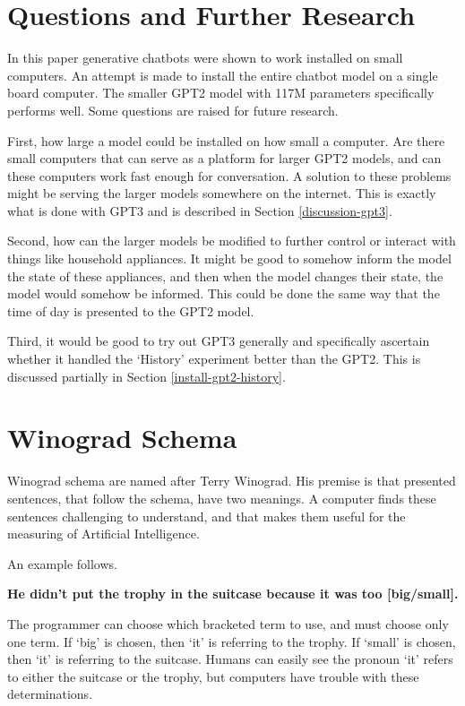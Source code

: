 \section{Questions and Further Research}

In this paper generative chatbots were shown to work installed on small computers. An attempt is made to install the entire chatbot model on a single board computer. The smaller GPT2 model with 117M parameters specifically performs well. Some questions are raised for future research.

First, how large a model could be installed on how small a computer. Are there small computers that can serve as a platform for larger GPT2 models, and can these computers work fast enough for conversation. A solution to these problems might be serving the larger models somewhere on the internet. This is exactly what is done with GPT3 and is described in Section \ref{discussion-gpt3}.

Second, how can the larger models be modified to further control or interact with things like household appliances. It might be good to somehow inform the model the state of these appliances, and then when the model changes their state, the model would somehow be informed. This could be done the same way that the time of day is presented to the GPT2 model.

Third, it would be good to try out GPT3 generally and specifically ascertain whether it handled the `History' experiment better than the GPT2. This is discussed partially in Section \ref{install-gpt2-history}. 


\section{Winograd Schema}

Winograd schema are named after Terry Winograd. His premise is that presented sentences, that follow the schema, have two meanings. A computer finds these sentences challenging to understand, and that makes them useful for the measuring of Artificial Intelligence.

An example follows.

\begin{center}
	\textbf{He didn't put the trophy in the suitcase because it was too [big/small].}
\end{center}

The programmer can choose which bracketed term to use, and must choose only one term. If `big' is chosen, then `it' is referring to the trophy. If `small' is chosen, then `it' is referring to the suitcase. Humans can easily see the pronoun `it' refers to either the suitcase or the trophy, but computers have trouble with these determinations.

